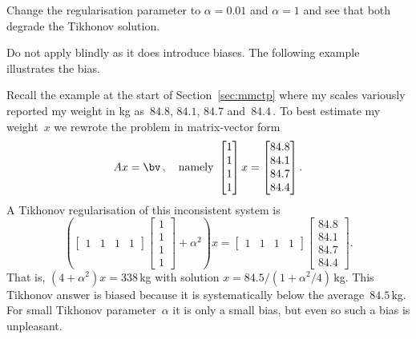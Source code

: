 \begin{example}
\begin{solution}
Change the regularisation parameter to \(\alpha=0.01\) and \(\alpha=1\) and see that both degrade the Tikhonov solution.
\end{solution}
\end{example}



Do not apply  blindly as it does introduce biases. 
The following example illustrates the bias.

\begin{example} \label{eg:}
Recall the example at the start of Section~\ref{sec:mmctp} where my scales variously reported my weight in kg as~\(84.8\), \(84.1\), \(84.7\) and~\(84.4\)\,.  
To best estimate my weight~\(x\) we rewrote the problem in matrix-vector form
\begin{equation*}
Ax=\bv\,,\quad\text{namely }
\begin{bmatrix} 1\\1\\1\\1 \end{bmatrix}x
=\begin{bmatrix} 84.8\\84.1\\84.7\\84.4 \end{bmatrix}.
\end{equation*}
A Tikhonov regularisation of this inconsistent system is
\begin{equation*}
\left(\begin{bmatrix} 1&1&1&1 \end{bmatrix}\begin{bmatrix} 1\\1\\1\\1 \end{bmatrix}+\alpha^2\right)x
=\begin{bmatrix} 1&1&1&1 \end{bmatrix}\begin{bmatrix} 84.8\\84.1\\84.7\\84.4 \end{bmatrix}.
\end{equation*}
That is, \((4+\alpha^2)x=338\)\,kg with solution \(x=84.5/(1+\alpha^2/4)\)\,kg.
This Tikhonov answer is biased because it is systematically below the average~\(84.5\)\,kg.
For small Tikhonov parameter~\(\alpha\) it is only a small bias, but even so such a bias is unpleasant.
\end{example}



